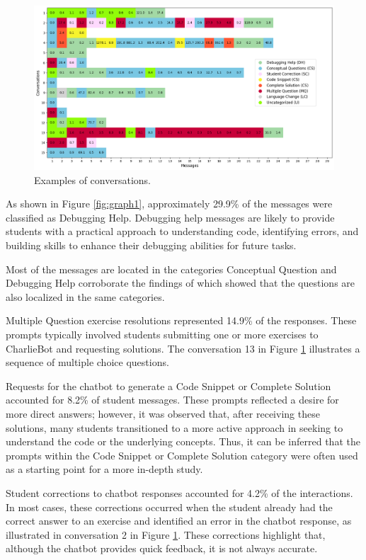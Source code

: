 \documentclass[a4paper,twoside]{article}
\begin{document}
\begin{figure}[htbp]
  \centering
  \includegraphics[scale=0.45]{img/figure2.png}
  \caption{Examples of conversations.}
  \label{fig:graph2}
\end{figure}

As shown in Figure \ref{fig:graph1}, approximately 29.9\% of the messages were
classified as Debugging Help. Debugging help messages are likely to provide
students with a practical approach to understanding code, identifying errors,
and building skills to enhance their debugging abilities for future tasks.

Most of the messages are located in the categories Conceptual Question and
Debugging Help corroborate the findings of \cite{Ghimire24} which showed that
the questions are also localized in the same categories.

Multiple Question exercise resolutions represented 14.9\% of the responses.
These prompts typically involved students submitting one or more exercises to
CharlieBot and requesting solutions. The conversation 13 in Figure
\ref{fig:graph2} illustrates a sequence of multiple choice questions.

Requests for the chatbot to generate a Code Snippet or Complete Solution accounted
for 8.2\% of student messages. These prompts reflected a desire for more
direct answers; however, it was observed that, after receiving these solutions,
many students transitioned to a more active approach in seeking to understand
the code or the underlying concepts. Thus, it can be inferred that the prompts
within the Code Snippet or Complete Solution category were often used as a
starting point for a more in-depth study.

Student corrections to chatbot responses accounted for 4.2\% of the interactions.
In most cases, these corrections occurred when the student already had the
correct answer to an exercise and identified an error in the chatbot response,
as illustrated in conversation 2 in Figure \ref{fig:graph2}. These corrections
highlight that, although the chatbot provides quick feedback, it is not always
accurate.
\end{document}
